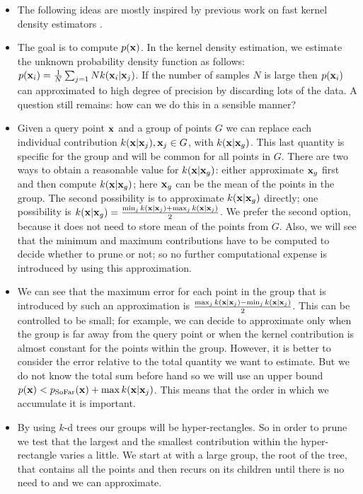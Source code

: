 \begin{itemize}
	\item The following ideas are mostly inspired by previous work on fast kernel density estimators \citep{gray2003,shen2006}.
	\item The goal is to compute $p(\mathbf{x})$. In the kernel density estimation, we estimate the unknown probability density function as follows: $p(\mathbf{x}_i) = \frac{1}{N}\sum_{j=1} Nk(\mathbf{x}_i|\mathbf{x}_j)$. If the number of samples $N$ is large then $p(\mathbf{x}_i)$ can approximated to high degree of precision by discarding lots of the data. A question still remains: how can we do this in a sensible manner? 
	\item Given a query point $\mathbf{x}$ and a group of points $G$ we can replace each individual contribution $k(\mathbf{x}|\mathbf{x}_j), \mathbf{x}_j\in G$, with $k(\mathbf{x}|\mathbf{x}_g)$. This last quantity is specific for the group and will be common for all points in $G$. There are two ways to obtain a reasonable value for $k(\mathbf{x}|\mathbf{x}_g)$: either approximate $\mathbf{x}_g$ first and then compute $k(\mathbf{x}|\mathbf{x}_g)$; here $\mathbf{x}_g$ can be the mean of the points in the group. The second possibility is to approximate $k(\mathbf{x}|\mathbf{x}_g)$ directly; one possibility is $k(\mathbf{x}|\mathbf{x}_g) = \frac{\min_jk(\mathbf{x}|\mathbf{x}_j) + \max_jk(\mathbf{x}|\mathbf{x}_j)}{2}$. We prefer the second option, because it does not need to store mean of the points from $G$. Also, we will see that the minimum and maximum contributions have to be computed to decide whether to prune or not; so no further computational expense is introduced by using this approximation.
	\item We can see that the maximum error for each point in the group that is introduced by such an approximation is $\frac{\max_jk(\mathbf{x}|\mathbf{x}_j) - \min_jk(\mathbf{x}|\mathbf{x}_j)}{2}$. This can be controlled to be small; for example, we can decide to approximate only when the group is far away from the query point or when the kernel contribution is almost constant for the points within the group. However, it is better to consider the error relative to the total quantity we want to estimate. But we do not know the total sum before hand so we will use an upper bound $p(\mathbf{x}) < p_{\text{SoFar}}(\mathbf{x}) + \max k(\mathbf{x}|\mathbf{x}_j) $. This means that the order in which we accumulate it is important. 
	\item By using $k$-d trees our groups will be hyper-rectangles. So in order to prune we test that the largest and the smallest contribution within the hyper-rectangle varies a little. We start at with a large group, the root of the tree, that contains all the points and then recurs on its children until there is no need to and we can approximate. 
\end{itemize}

